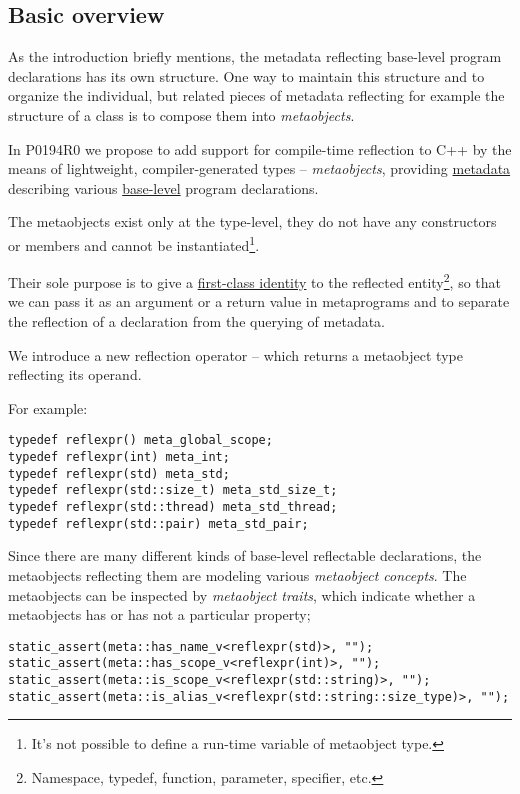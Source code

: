 \subsection{Basic overview}

As the introduction briefly mentions, the metadata reflecting base-level
program declarations has its own structure. One way to maintain this structure
and to organize the individual, but related pieces of metadata reflecting
for example the structure of a class is to compose them into {\em metaobjects}.

In P0194R0 we propose to add support for
compile-time reflection to C++ by the means of lightweight, compiler-generated
types -- {\em metaobjects}, providing \hyperref[term-metadata]{metadata}
describing various \hyperref[term-base-meta-level]{base-level} program declarations.

The metaobjects exist only at the type-level, they do not have any constructors
or members and cannot be instantiated\footnote{It's not possible to define
a run-time variable of metaobject type.}.

Their sole purpose is to give a \hyperref[term-first-class]{first-class identity}
to the reflected entity\footnote{Namespace, typedef, function, parameter, specifier, etc.},
so that we can pass it as an argument or a return value in metaprograms and to
separate the reflection of a declaration from the querying of metadata.

We introduce a new reflection operator -- \verb@reflexpr@ which returns a
metaobject type reflecting its operand.

For example:

\begin{verbatim}
typedef reflexpr() meta_global_scope;
typedef reflexpr(int) meta_int;
typedef reflexpr(std) meta_std;
typedef reflexpr(std::size_t) meta_std_size_t;
typedef reflexpr(std::thread) meta_std_thread;
typedef reflexpr(std::pair) meta_std_pair;
\end{verbatim}

Since there are many different kinds of
base-level reflectable declarations, the metaobjects reflecting them are
modeling various {\em metaobject concepts}. The metaobjects can be inspected
by {\em metaobject traits}, which indicate whether a metaobjects has or has
not a particular property;

\begin{verbatim}
static_assert(meta::has_name_v<reflexpr(std)>, "");
static_assert(meta::has_scope_v<reflexpr(int)>, "");
static_assert(meta::is_scope_v<reflexpr(std::string)>, "");
static_assert(meta::is_alias_v<reflexpr(std::string::size_type)>, "");
\end{verbatim}

